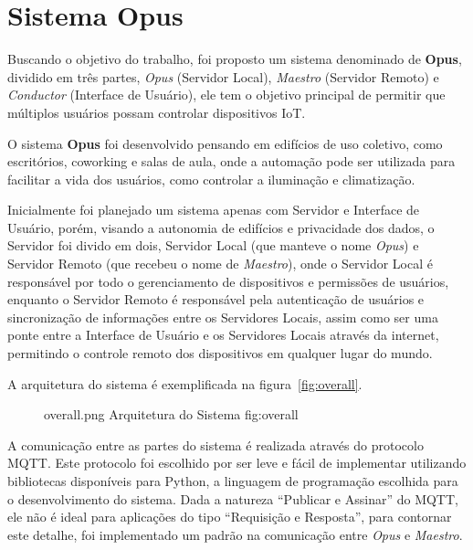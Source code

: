\chapter{Sistema Opus}

Buscando o objetivo do trabalho, foi proposto um sistema denominado de \textbf{Opus}, dividido em três partes, 
\emph{Opus} (Servidor Local), \emph{Maestro} (Servidor Remoto) e \emph{Conductor} (Interface de Usuário), 
ele tem o objetivo principal de permitir que múltiplos usuários possam controlar dispositivos IoT.

O sistema \textbf{Opus} foi desenvolvido pensando em edifícios de uso coletivo, como escritórios, coworking e
salas de aula, onde a automação pode ser utilizada para facilitar a vida dos usuários, como controlar a iluminação e
climatização. 

Inicialmente foi planejado um sistema apenas com Servidor e Interface de Usuário, porém, visando a autonomia de edifícios e
privacidade dos dados, o Servidor foi divido em dois, Servidor Local (que manteve o nome \emph{Opus}) e Servidor Remoto (que recebeu o nome de 
\emph{Maestro}), onde o Servidor Local é responsável por todo o gerenciamento de dispositivos e permissões de usuários, 
enquanto o Servidor Remoto é responsável pela autenticação de usuários e sincronização de informações entre os Servidores Locais,
assim como ser uma ponte entre a Interface de Usuário e os Servidores Locais através da internet, permitindo o controle remoto
dos dispositivos em qualquer lugar do mundo.

A arquitetura do sistema é exemplificada na figura~\ref{fig:overall}.

\begin{figure}[h!]
    {overall.png}
    {Arquitetura do Sistema}
    {fig:overall}
\end{figure}

A comunicação entre as partes do sistema é realizada através do protocolo MQTT. 
Este protocolo foi escolhido por ser leve e fácil de implementar utilizando bibliotecas disponíveis para Python,
a linguagem de programação escolhida para o desenvolvimento do sistema. Dada a natureza ``Publicar e Assinar'' do MQTT,
ele não é ideal para aplicações do tipo ``Requisição e Resposta'', para contornar este detalhe, foi implementado um padrão na comunicação entre
\emph{Opus} e \emph{Maestro}.

